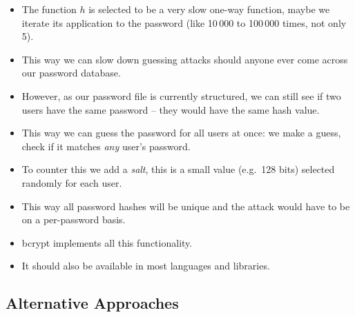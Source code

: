 \documentclass{beamer}
\begin{document}
\begin{frame}
  \begin{itemize}
    \item The function \(h\) is selected to be a very slow one-way function, 
      maybe we iterate its application to the password (like 10\,000 to 
      100\,000 times, not only 5).

    \item This way we can slow down guessing attacks should anyone ever come 
      across our password database.

    \item However, as our password file is currently structured, we can still 
      see if two users have the same password -- they would have the same hash 
      value.

    \item This way we can guess the password for all users at once: we make 
      a guess, check if it matches \emph{any} user's password.

    \item To counter this we add a \emph{salt}, this is a small value (e.g.\ 
      128 bits) selected randomly for each user.

    \item This way all password hashes will be unique and the attack would have 
      to be on a per-password basis.

  \end{itemize}
\end{frame}

\begin{frame}
  \begin{itemize}
    \item bcrypt implements all this functionality.
    \item It should also be available in most languages and libraries.
  \end{itemize}
\end{frame}

\subsection{Alternative Approaches}
\end{document}
